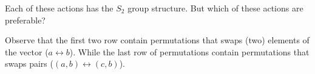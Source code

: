 Each of these actions has the $S_2$ group structure.
But which of these actions are preferable?

Observe that the first two row contain permutations that swaps (two) elements of the vector ($a\leftrightarrow b$).
While the last row of permutations contain permutations that swaps pairs ($(a, b) \leftrightarrow (c, b)$).
